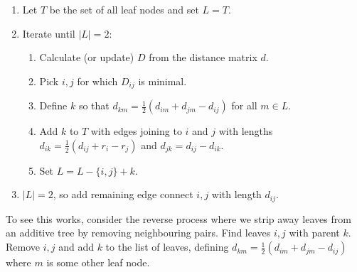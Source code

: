 \documentclass[11pt]{article}
\begin{document}
\begin{enumerate}
\item Let $T$ be the set of all leaf nodes and set $L = T$.
\item Iterate  until $|L| = 2$: 
\begin{enumerate} 
\item Calculate (or update) $D$ from the distance matrix  $d$.
\item Pick $i,j$ for which $D_{ij}$ is minimal.
\item Define $k$ so that $d_{km} = \frac12(d_{im} + d_{jm} - d_{ij})$ for all $m \in L$.
\item Add $k$ to $T$ with edges joining to $i$ and $j$ with lengths $d_{ik} =\frac12(d_{ij} + r_i - r_j) $ and $d_{jk}  = d_{ij} - d_{ik}.$
\item Set $L = L - \{i,j\} + {k}$.
\end{enumerate}
\item $|L| = 2$, so add remaining edge connect $i,j$ with length $d_{ij}$.
\end{enumerate}
To see this works, consider the reverse process where we strip away leaves from an additive tree by removing neighbouring pairs.  Find leaves $i,j$ with parent $k$.  Remove $i,j$ and add $k$ to the list of leaves, defining $d_{km} = \frac12(d_{im} + d_{jm} - d_{ij})$ where $m$ is some other leaf node.   
\end{document}
